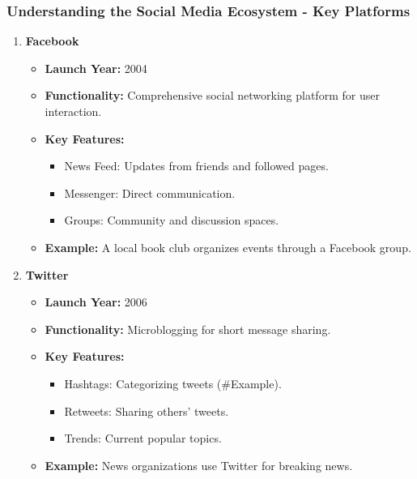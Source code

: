 \documentclass{beamer}
\begin{document}
\begin{frame}[fragile]
    \frametitle{Understanding the Social Media Ecosystem - Key Platforms}
    \begin{enumerate}
        \item \textbf{Facebook}
            \begin{itemize}
                \item \textbf{Launch Year:} 2004
                \item \textbf{Functionality:} Comprehensive social networking platform for user interaction.
                \item \textbf{Key Features:}
                    \begin{itemize}
                        \item News Feed: Updates from friends and followed pages.
                        \item Messenger: Direct communication.
                        \item Groups: Community and discussion spaces.
                    \end{itemize}
                \item \textbf{Example:} A local book club organizes events through a Facebook group.
            \end{itemize}
        
        \item \textbf{Twitter}
            \begin{itemize}
                \item \textbf{Launch Year:} 2006
                \item \textbf{Functionality:} Microblogging for short message sharing.
                \item \textbf{Key Features:}
                    \begin{itemize}
                        \item Hashtags: Categorizing tweets (#Example).
                        \item Retweets: Sharing others' tweets.
                        \item Trends: Current popular topics.
                    \end{itemize}
                \item \textbf{Example:} News organizations use Twitter for breaking news.
            \end{itemize}
    \end{enumerate}
\end{frame}
\end{document}
